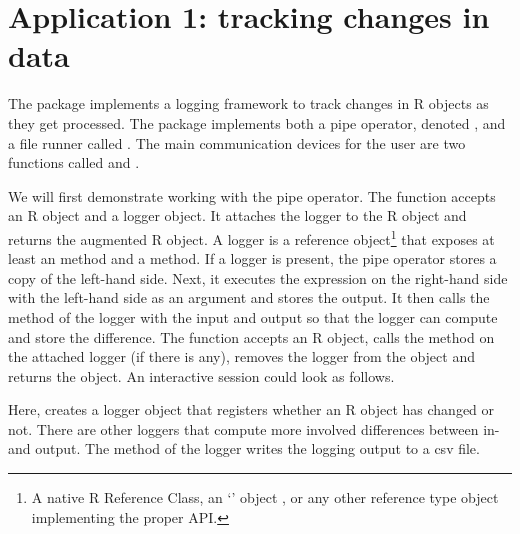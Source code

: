 \section{Application 1: tracking changes in data}
\label{sect:examples}

The  package \citep{loo2019lumberjack} implements a logging
framework to track changes in R objects as they get processed. The package
implements both a pipe operator, denoted , and a file runner called
. The main communication devices for the user are two
functions called  and . 

We will first demonstrate working with the  pipe operator.
The function  accepts an R object and a logger object. It
attaches the logger to the R object and returns the augmented R object. A
logger is a reference object\footnote{A native R Reference Class, an
`' object \citep{chang2019r6}, or any other reference type object
implementing the proper API.} that exposes at least an  method
and a  method.  If a logger is present, the pipe operator stores
a copy of the left-hand side.  Next, it executes the expression on the
right-hand side with the left-hand side as an argument and stores the output.
It then calls the  method of the logger with the input and output
so that the logger can compute and store the difference.  The
 function accepts an R object, calls the 
method on the attached logger (if there is any), removes the logger from the
object and returns the object. An interactive session could look as follows.
Here,  creates a logger object that registers whether an R
object has changed or not. There are other loggers that compute more involved
differences between in- and output. The  method of the logger
writes the logging output to a csv file.  


